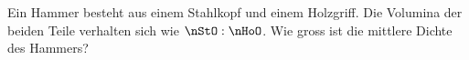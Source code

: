 Ein Hammer besteht aus einem Stahlkopf und einem Holzgriff. Die Volumina der beiden Teile verhalten sich wie $\nStO : \nHoO$. Wie gross ist die mittlere Dichte des Hammers?
